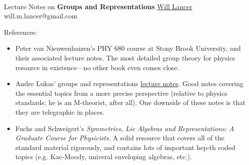 \documentclass[11pt]{article}
\begin{document}
\thispagestyle{empty}
\bigskip \
\vspace{0.1cm}

\begin{center}
{\fontsize{22}{22} \selectfont Lecture Notes on}
\vskip 16pt
{\fontsize{36}{36} \selectfont \bf \sffamily Groups and Representations}
\vskip 24pt
{\fontsize{18}{18} \selectfont \rmfamily \href{https://will-lancer.github.io}{Will Lancer}} 
\vskip 6pt
{\fontsize{14}{14} \selectfont \ttfamily will.m.lancer@gmail.com} 
\vskip 24pt
\end{center}

{\parindent0pt \baselineskip=15.5pt}
\noin
References:
\begin{itemize}
    \item Peter van Nieuwenhuizen's PHY 680 course at Stony Brook University,
    and their associated lecture notes. The most detailed group theory for physics
    resource in existence---no other book even comes close.
    \item Andre Lukas' groups and representations \href{https://www-thphys.physics.ox.ac.uk/people/AndreLukas/GroupsandRepresentations/groupsrepslecturenotes.pdf}{lecture notes}.
    Good notes covering the essential topics from a more precise perspective (relative
    to physics standards; he is an M-theorist, after all). One downside of these notes is 
    that they are telegraphic in places.
    \item Fuchs and Schweigert's \emph{Symmetries, Lie Algebras and Representations: 
    A Graduate Course for Physicists}. A solid resource that covers all of the standard
    material rigorously, and contains lots of important hep-th coded topics (e.g. Kac-Moody,
    univeral enveloping algebras, etc.).
\end{itemize}


\end{document}

